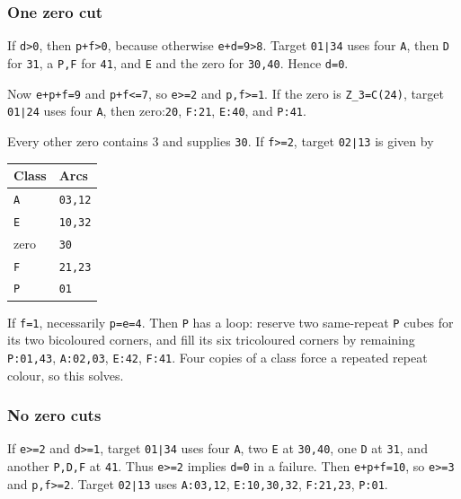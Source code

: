 \documentclass[
  10pt,
]{article}
\begin{document}
\hypertarget{one-zero-cut}{%
\subsubsection*{One zero cut}\label{one-zero-cut}}

If \texttt{d\textgreater{}0}, then \texttt{p+f\textgreater{}0}, because
otherwise \texttt{e+d=9\textgreater{}8}. Target \texttt{01∣34} uses four
\texttt{A}, then \texttt{D} for \texttt{31}, a \texttt{P,F} for
\texttt{41}, and \texttt{E} and the zero for \texttt{30,40}. Hence
\texttt{d=0}.

Now \texttt{e+p+f=9} and \texttt{p+f\textless{}=7}, so
\texttt{e\textgreater{}=2} and \texttt{p,f\textgreater{}=1}. If the zero
is \texttt{Z\_3=C(24)}, target \texttt{01∣24} uses four \texttt{A}, then
zero:\texttt{20}, \texttt{F:21}, \texttt{E:40}, and \texttt{P:41}.

Every other zero contains 3 and supplies \texttt{30}. If
\texttt{f\textgreater{}=2}, target \texttt{02∣13} is given by

\begin{longtable}[]{@{}ll@{}}
\toprule\noalign{}
Class & Arcs \\
\midrule\noalign{}
\endhead
\bottomrule\noalign{}
\endlastfoot
\texttt{A} & \texttt{03,12} \\
\texttt{E} & \texttt{10,32} \\
zero & \texttt{30} \\
\texttt{F} & \texttt{21,23} \\
\texttt{P} & \texttt{01} \\
\end{longtable}

If \texttt{f=1}, necessarily \texttt{p=e=4}. Then \texttt{P} has a loop:
reserve two same-repeat \texttt{P} cubes for its two bicoloured corners,
and fill its six tricoloured corners by remaining \texttt{P:01,43},
\texttt{A:02,03}, \texttt{E:42}, \texttt{F:41}. Four copies of a class
force a repeated repeat colour, so this solves.

\hypertarget{no-zero-cuts}{%
\subsubsection*{No zero cuts}\label{no-zero-cuts}}

If \texttt{e\textgreater{}=2} and \texttt{d\textgreater{}=1}, target
\texttt{01∣34} uses four \texttt{A}, two \texttt{E} at \texttt{30,40},
one \texttt{D} at \texttt{31}, and another \texttt{P,D,F} at
\texttt{41}. Thus \texttt{e\textgreater{}=2} implies \texttt{d=0} in a
failure. Then \texttt{e+p+f=10}, so \texttt{e\textgreater{}=3} and
\texttt{p,f\textgreater{}=2}. Target \texttt{02∣13} uses
\texttt{A:03,12}, \texttt{E:10,30,32}, \texttt{F:21,23}, \texttt{P:01}.
\end{document}

